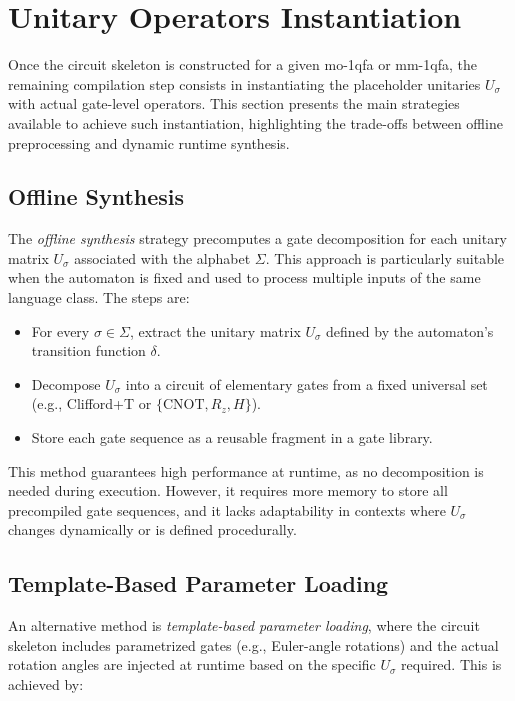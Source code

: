 \section{Unitary Operators Instantiation}
\label{sec:unitary-operators-instantiation}

Once the circuit skeleton is constructed for a given \gls{mo-1qfa} or \gls{mm-1qfa}, the remaining compilation step consists in instantiating the placeholder unitaries $U_{\sigma}$ with actual gate-level operators. This section presents the main strategies available to achieve such instantiation, highlighting the trade-offs between offline preprocessing and dynamic runtime synthesis.

\subsection{Offline Synthesis}

The \emph{offline synthesis} strategy precomputes a gate decomposition for each unitary matrix $U_{\sigma}$ associated with the alphabet $\Sigma$. This approach is particularly suitable when the automaton is fixed and used to process multiple inputs of the same language class. The steps are:

\begin{itemize}
    \item For every $\sigma \in \Sigma$, extract the unitary matrix $U_{\sigma}$ defined by the automaton's transition function $\delta$.
    \item Decompose $U_{\sigma}$ into a circuit of elementary gates from a fixed universal set (e.g., Clifford+T or $\{\mathrm{CNOT}, R_z, H\}$).
    \item Store each gate sequence as a reusable fragment in a gate library.
\end{itemize}

This method guarantees high performance at runtime, as no decomposition is needed during execution. However, it requires more memory to store all precompiled gate sequences, and it lacks adaptability in contexts where $U_{\sigma}$ changes dynamically or is defined procedurally.

\subsection{Template-Based Parameter Loading}

An alternative method is \emph{template-based parameter loading}, where the circuit skeleton includes parametrized gates (e.g., Euler-angle rotations) and the actual rotation angles are injected at runtime based on the specific $U_{\sigma}$ required. This is achieved by:

